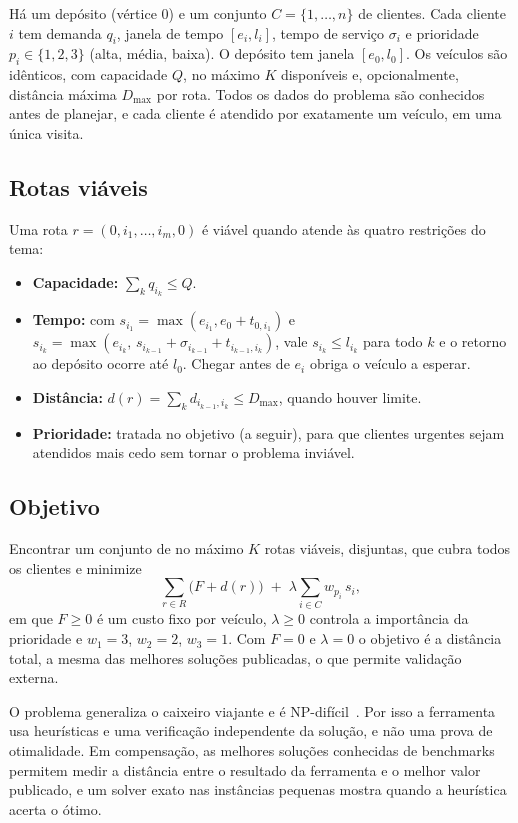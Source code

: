 \documentclass[12pt]{article}
\begin{document}
Há um depósito (vértice $0$) e um conjunto $C=\{1,\dots,n\}$ de clientes. Cada cliente $i$ tem demanda $q_i$, janela de tempo $[e_i,l_i]$, tempo de serviço $\sigma_i$ e prioridade $p_i\in\{1,2,3\}$ (alta, média, baixa). O depósito tem janela $[e_0,l_0]$. Os veículos são idênticos, com capacidade $Q$, no máximo $K$ disponíveis e, opcionalmente, distância máxima $D_{\max}$ por rota. Todos os dados do problema são conhecidos antes de planejar, e cada cliente é atendido por exatamente um veículo, em uma única visita.

\subsection{Rotas viáveis}

Uma rota $r=(0,i_1,\dots,i_m,0)$ é viável quando atende às quatro restrições do tema:
\begin{itemize}
  \item \textbf{Capacidade:} $\sum_{k} q_{i_k}\le Q$.
  \item \textbf{Tempo:} com $s_{i_1}=\max(e_{i_1},e_0+t_{0,i_1})$ e $s_{i_k}=\max(e_{i_k},\,s_{i_{k-1}}+\sigma_{i_{k-1}}+t_{i_{k-1},i_k})$, vale $s_{i_k}\le l_{i_k}$ para todo $k$ e o retorno ao depósito ocorre até $l_0$. Chegar antes de $e_i$ obriga o veículo a esperar.
  \item \textbf{Distância:} $d(r)=\sum_k d_{i_{k-1},i_k}\le D_{\max}$, quando houver limite.
  \item \textbf{Prioridade:} tratada no objetivo (a seguir), para que clientes urgentes sejam atendidos mais cedo sem tornar o problema inviável.
\end{itemize}

\subsection{Objetivo}

Encontrar um conjunto de no máximo $K$ rotas viáveis, disjuntas, que cubra todos os clientes e minimize
\begin{equation}
\sum_{r\in R}\bigl(F + d(r)\bigr)\;+\;\lambda\sum_{i\in C} w_{p_i}\, s_i,
\end{equation}
em que $F\ge 0$ é um custo fixo por veículo, $\lambda\ge0$ controla a importância da prioridade e $w_1=3$, $w_2=2$, $w_3=1$. Com $F=0$ e $\lambda=0$ o objetivo é a distância total, a mesma das melhores soluções publicadas, o que permite validação externa.

O problema generaliza o caixeiro viajante e é NP-difícil~\cite{lenstra1981}. Por isso a ferramenta usa heurísticas e uma verificação independente da solução, e não uma prova de otimalidade. Em compensação, as melhores soluções conhecidas de benchmarks permitem medir a distância entre o resultado da ferramenta e o melhor valor publicado, e um solver exato nas instâncias pequenas mostra quando a heurística acerta o ótimo.
\end{document}
